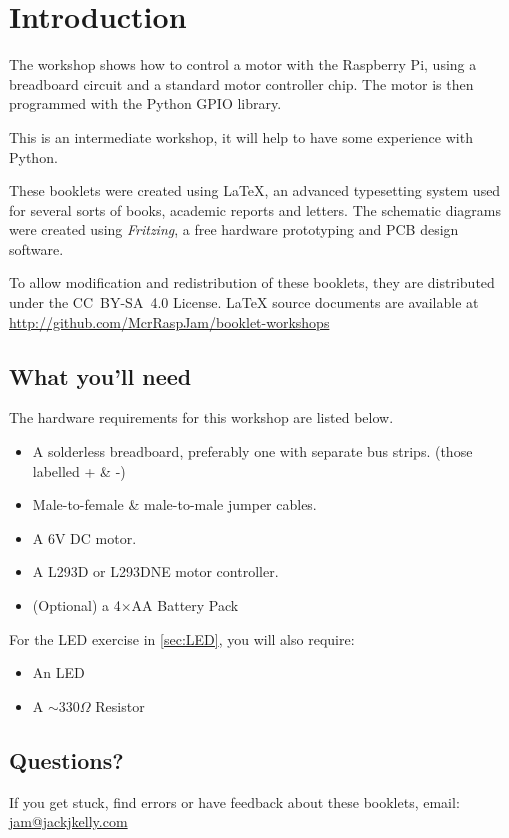 \setcounter{section}{-1}
\section{Introduction}
	
	
	The workshop shows how to control a motor with the Raspberry Pi, using a breadboard circuit and a standard motor controller chip. The motor is then programmed with the Python GPIO library.

	This is an intermediate workshop, it will help to have some experience with Python.
		
	These booklets were created using {\selectfont \LaTeX}, an advanced typesetting system used for several sorts of books, academic reports and letters. The schematic diagrams were created using \textit{Fritzing}, a free hardware prototyping and PCB design software.
		
	To allow modification and redistribution of these booklets, they are distributed under the \hbox{CC BY-SA 4.0} License. LaTeX source documents are available at \url{http://github.com/McrRaspJam/booklet-workshops}
	
	
	\subsection*{What you'll need}
		
			
		The hardware requirements for this workshop are listed below.
	
		\begin{itemize}[nosep]		
			\item A solderless breadboard, preferably one with separate bus strips. (those labelled + \& -)
			\item Male-to-female \& male-to-male jumper cables.
			\item A 6V DC motor.
			\item A L293D or L293DNE motor controller.
			\item (Optional) a 4$\times$AA Battery Pack				
		\end{itemize}

		For the LED exercise in \autoref{sec:LED}, you will also require:
			
		\begin{itemize}[nosep]	
			\item An LED
			\item A $\sim 330 \Omega$ Resistor
		\end{itemize}
				
	
			
	
		
	\subsection*{Questions?}
		If you get stuck, find errors or have feedback about these booklets, email:
		\url{jam@jackjkelly.com}\label{email}